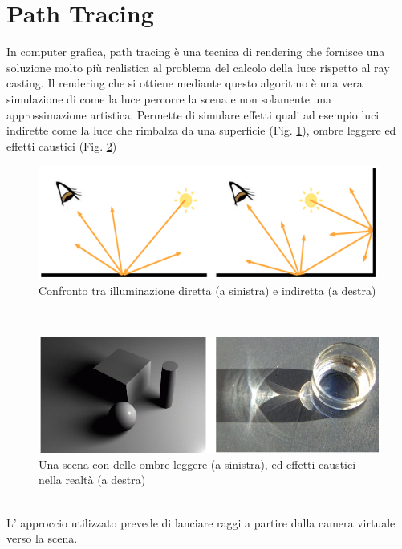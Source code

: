 \newpage
\section{Path Tracing}
\label{sec:chapter_stato_arte_path_tracing}
In computer grafica, path tracing è una tecnica di rendering che fornisce una soluzione molto più realistica al problema del calcolo della luce rispetto al ray casting.
Il rendering che si ottiene mediante questo algoritmo è una vera simulazione di come la luce percorre la scena e non solamente una approssimazione artistica. Permette di simulare effetti quali ad esempio luci indirette come la luce che rimbalza da una superficie (Fig. \ref{fig:stato_arte_luci_dir_ind}), ombre leggere ed effetti caustici \cite{path1,monte_path} (Fig. \ref{fig:stato_arte_ombre_caust}) 
\\
\begin{figure}[htb]
 \centering
 \includegraphics[width=0.9\linewidth]{images/chapter_stato_arte/stato_arte_luci_dir_ind.png}\hfill
 \caption[Illuminazione diretta e indiretta]{Confronto tra illuminazione diretta (a sinistra) e indiretta (a destra)}
 \label{fig:stato_arte_luci_dir_ind}
\end{figure}
\\
\begin{figure}[htb]
 \centering
 \includegraphics[width=0.9\linewidth]{images/chapter_stato_arte/stato_arte_ombre_caust.png}\hfill
 \caption[Ombreggiature ed effetti caustici]{Una scena con delle ombre leggere (a sinistra), ed effetti caustici nella realtà (a destra)}
 \label{fig:stato_arte_ombre_caust}
\end{figure}
\\
L’ approccio utilizzato prevede di lanciare raggi a partire dalla camera virtuale verso la scena. 
